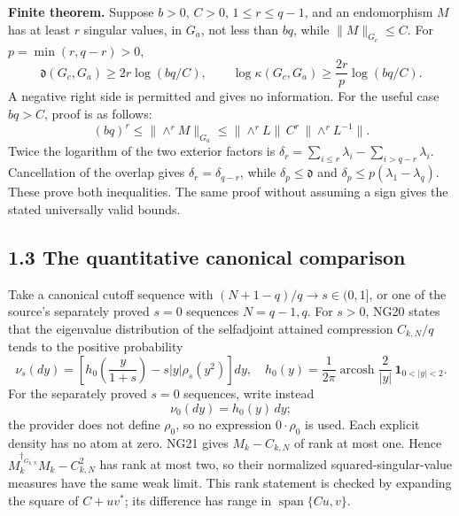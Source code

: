 \documentclass[
  11pt,
]{article}
\begin{document}
\textbf{Finite theorem.} Suppose \(b>0\), \(C>0\), \(1\le r\le q-1\),
and an endomorphism \(M\) has at least \(r\) singular values, in
\(G_a\), not less than \(bq\), while \(\|M\|_{G_c}\le C\). For
\(p=\min(r,q-r)>0\), \[
\mathfrak d(G_c,G_a)\ge2r\log(bq/C),
\qquad
\log\kappa(G_c,G_a)\ge\frac{2r}{p}\log(bq/C). \tag{MR6}
\] A negative right side is permitted and gives no information. For the
useful case \(bq>C\), proof is as follows: \[
(bq)^r\le\|\wedge^rM\|_{G_a}
\le\|\wedge^rL\|\,C^r\,\|\wedge^rL^{-1}\|.
\] Twice the logarithm of the two exterior factors is
\(\delta_r=\sum_{i\le r}\lambda_i-\sum_{i>q-r}\lambda_i\). Cancellation
of the overlap gives \(\delta_r=\delta_{q-r}\), while
\(\delta_p\le\mathfrak d\) and \(\delta_p\le p(\lambda_1-\lambda_q)\).
These prove both inequalities. The same proof without assuming a sign
gives the stated universally valid bounds.

\subsection{1.3 The quantitative canonical
comparison}\label{the-quantitative-canonical-comparison}

Take a canonical cutoff sequence with \((N+1-q)/q\to s\in(0,1]\), or one
of the source's separately proved \(s=0\) sequences \(N=q-1,q\). For
\(s>0\), NG20 states that the eigenvalue distribution of the selfadjoint
attained compression \(C_{k,N}/q\) tends to the positive probability \[
\nu_s(dy)=\left[h_0\left(\frac y{1+s}\right)-s|y|\rho_s(y^2)\right]dy,
\quad h_0(y)=\frac1{2\pi}\operatorname{arcosh}\frac2{|y|}\,\mathbf1_{0<|y|<2}.
\] For the separately proved \(s=0\) sequences, write instead \[
\nu_0(dy)=h_0(y)\,dy;
\] the provider does not define \(\rho_0\), so no expression
\(0\cdot\rho_0\) is used. Each explicit density has no atom at zero.
NG21 gives \(M_k-C_{k,N}\) of rank at most one. Hence
\(M_k^{\dagger_{G_{k,N}}}M_k-C_{k,N}^2\) has rank at most two, so their
normalized squared-singular-value measures have the same weak limit.
This rank statement is checked by expanding the square of \(C+uv^*\);
its difference has range in \(\operatorname{span}\{Cu,v\}\).
\end{document}
